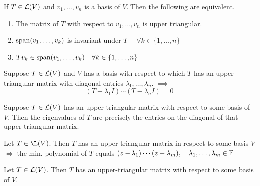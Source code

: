 \setcounter{thm}{38}
\begin{thm}
    \label{conditions for upper-triangular matrix}
    If $T \in \mathcal{L} (V)$ and $v_1, \dots, v_n$ is a basis of $V$. Then the following are equivalent.
    \begin{enumerate}[label=(\alph*)]

        \item The matrix of $T$ with respect to $v_1, \dots, v_n$ is upper triangular.
        \item $\operatorname{span} (v_1, \dots, v_k)$ is invariant under $T$ $\quad \forall k \in \{ 1, \dots, n\}$
        \item $T v_k \in \operatorname{span} (v_1, \dots, v_k) \quad \forall k \in \{1, \dots, n\}$
    \end{enumerate}
\end{thm}

\begin{thm}
    \label{equation-satisfied-by-operator-with-upper-triangular-matrix}
    Suppose $T\in \mathcal{L}(V)$ and $V$ has a basis with respect to which $T$ has an upper-triangular matrix with diagonal entries $\lambda_1, \dots, \lambda_n$. $\implies$
    \begin{equation}
        (T-\lambda_1I) \cdots (T-\lambda_nI)=0
    \end{equation}
\end{thm}

\begin{thm}
    \label{determination-of-eigenvalue-from-upper-triangular-matrix}
    Suppose $T\in \mathcal{L}(V)$ has an upper-triangular matrix with respect to some basis of $V$. Then the eigenvalues of $T$ are precisely the entries on the diagonal of that upper-triangular matrix.
\end{thm}

\begin{thm}
    \label{necessary and sufficient condition to have an upper-triangular-matrix}
    Let $T\in \L(V)$. Then $T$ has an upper-triangular matrix in respect to some basis $V$ $\iff$ the min. polynomial of $T$ equals $(z-\lambda_1) \cdots (z-\lambda_m), \quad \lambda_1, \dots, \lambda_m \in \mathbb{F}$
\end{thm}

\begin{thm}
    \label{If-F-equals-C-every-operator-on-V-has-an-upper-triangular-matrix}
    Let $T\in \mathcal{L} (V)$. Then $T$ has an upper-triangular matrix with respect to some basis of $V$.
\end{thm}

